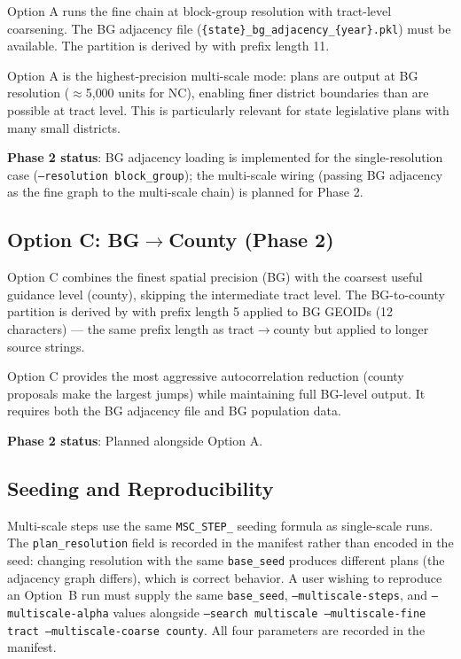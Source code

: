 Option A runs the fine chain at block-group resolution with tract-level
coarsening.
The BG adjacency file (\texttt{\{state\}\_bg\_adjacency\_\{year\}.pkl})
must be available.
The partition is derived by \derive{} with prefix length 11.

Option A is the highest-precision multi-scale mode: plans are output at
BG resolution ($\approx$5{,}000 units for NC), enabling finer district
boundaries than are possible at tract level.
This is particularly relevant for state legislative plans with many small
districts.

\textbf{Phase 2 status}: BG adjacency loading is implemented for the
single-resolution case (\texttt{--resolution block\_group});
the multi-scale wiring (passing BG adjacency as the fine graph to the
multi-scale chain) is planned for Phase 2.

\subsection{Option C: BG$\to$County (Phase 2)}
\label{ssec:optionc}

Option C combines the finest spatial precision (BG) with the coarsest
useful guidance level (county), skipping the intermediate tract level.
The BG-to-county partition is derived by \derive{} with prefix length 5
applied to BG GEOIDs (12 characters) --- the same prefix length as
tract$\to$county but applied to longer source strings.

Option C provides the most aggressive autocorrelation reduction (county
proposals make the largest jumps) while maintaining full BG-level output.
It requires both the BG adjacency file and BG population data.

\textbf{Phase 2 status}: Planned alongside Option A.

\subsection{Seeding and Reproducibility}

Multi-scale steps use the same \texttt{MSC\_STEP\_} seeding formula as
single-scale runs.
The \texttt{plan\_resolution} field is recorded in the manifest rather
than encoded in the seed: changing resolution with the same
\texttt{base\_seed} produces different plans (the adjacency graph differs),
which is correct behavior.
A user wishing to reproduce an Option~B run must supply the same
\texttt{base\_seed}, \texttt{--multiscale-steps}, and
\texttt{--multiscale-alpha} values alongside \texttt{--search multiscale
--multiscale-fine tract --multiscale-coarse county}.
All four parameters are recorded in the manifest.

